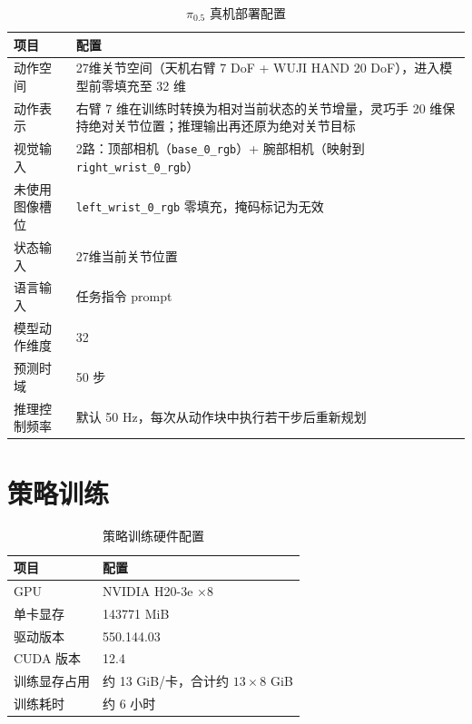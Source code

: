 \begin{table}[htb]
    \centering
    \caption{$\pi_{0.5}$ 真机部署配置}\label{tab:pi05_config_app}
    \begin{tabular}{lp{}}
        \hline
        项目 & 配置 \\
        \hline
        动作空间 & 27维关节空间（天机右臂 7 DoF + WUJI HAND 20 DoF），进入模型前零填充至 32 维\\
        动作表示 & 右臂 7 维在训练时转换为相对当前状态的关节增量，灵巧手 20 维保持绝对关节位置；推理输出再还原为绝对关节目标\\
        视觉输入 & 2路：顶部相机（\texttt{base\_0\_rgb}）+ 腕部相机（映射到 \texttt{right\_wrist\_0\_rgb}）\\
        未使用图像槽位 & \texttt{left\_wrist\_0\_rgb} 零填充，掩码标记为无效 \\
        状态输入 & 27维当前关节位置 \\
        语言输入 & 任务指令 prompt \\
        模型动作维度 & 32 \\
        预测时域 & 50 步 \\
        推理控制频率 & 默认 50 Hz，每次从动作块中执行若干步后重新规划 \\
        \hline
    \end{tabular}
\end{table}

\section{策略训练}

\begin{table}[htb]
    \centering
    \caption{策略训练硬件配置}\label{tab:pi05_training_hardware}
    \begin{tabular}{lp{}}
        \hline
        项目 & 配置 \\
        \hline
        GPU & NVIDIA H20\mbox{-}3e $\times 8$ \\
        单卡显存 & 143771 MiB \\
        驱动版本 & 550.144.03 \\
        CUDA 版本 & 12.4 \\
        训练显存占用 & 约 13 GiB/卡，合计约 $13 \times 8$ GiB \\
        训练耗时 & 约 6 小时 \\
        \hline
    \end{tabular}
\end{table}

